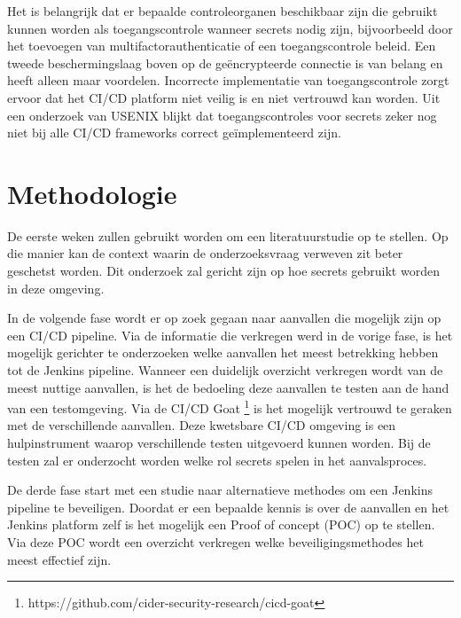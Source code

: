 Het is belangrijk dat er bepaalde controleorganen beschikbaar zijn die gebruikt kunnen worden als toegangscontrole wanneer secrets nodig zijn, bijvoorbeeld door het toevoegen van multifactorauthenticatie of een toegangscontrole beleid. Een tweede beschermingslaag boven op de geëncrypteerde connectie is van belang en heeft alleen maar voordelen. Incorrecte implementatie van toegangscontrole zorgt ervoor dat het CI/CD platform niet veilig is en niet vertrouwd kan worden. Uit een onderzoek van USENIX \autocite{Koishybayev2022} blijkt dat toegangscontroles voor secrets zeker nog niet bij alle CI/CD frameworks correct geïmplementeerd zijn.




\section{Methodologie}%
\label{sec:methodologie}

De eerste weken zullen gebruikt worden om een literatuurstudie op te stellen. Op die manier kan de context waarin de onderzoeksvraag verweven zit beter geschetst worden. Dit onderzoek zal gericht zijn op hoe secrets gebruikt worden in deze omgeving. 

In de volgende fase wordt er op zoek gegaan naar aanvallen die mogelijk zijn op een CI/CD pipeline. Via de informatie die verkregen werd in de vorige fase, is het mogelijk gerichter te onderzoeken welke aanvallen het meest betrekking hebben tot de Jenkins pipeline.  Wanneer een duidelijk overzicht verkregen wordt van de meest nuttige aanvallen, is het de bedoeling deze aanvallen te testen aan de hand van een testomgeving. Via de CI/CD Goat \footnote{https://github.com/cider-security-research/cicd-goat} is het mogelijk vertrouwd te geraken met de verschillende aanvallen. Deze kwetsbare CI/CD omgeving is een hulpinstrument waarop verschillende testen uitgevoerd kunnen worden. Bij de testen zal er onderzocht worden welke rol secrets spelen in het aanvalsproces.  

De derde fase start met een studie naar alternatieve methodes om  een Jenkins pipeline te beveiligen. Doordat er een bepaalde kennis is over de aanvallen en het Jenkins platform zelf is het mogelijk een Proof of concept (POC) op te stellen. Via deze POC wordt een overzicht verkregen welke beveiligingsmethodes het meest effectief zijn.

